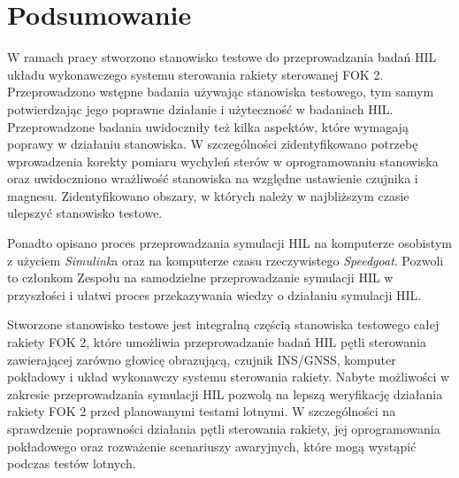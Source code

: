 \section{Podsumowanie}
\label{sec:podsumowanie}
W ramach pracy stworzono stanowisko testowe do przeprowadzania badań HIL układu wykonawczego systemu sterowania rakiety sterowanej FOK 2.
Przeprowadzono wstępne badania używając stanowiska testowego, tym samym potwierdzając jego poprawne działanie
i użyteczność w badaniach HIL. Przeprowadzone badania uwidoczniły też kilka aspektów, które wymagają poprawy w działaniu stanowiska.
W szczególności zidentyfikowano potrzebę wprowadzenia korekty pomiaru wychyleń sterów w oprogramowaniu stanowiska oraz
uwidoczniono wrażliwość stanowiska na względne ustawienie czujnika i magnesu. 
Zidentyfikowano obszary, w których należy w najbliższym czasie ulepszyć stanowisko testowe.

Ponadto opisano proces przeprowadzania symulacji HIL na komputerze osobistym z użyciem \textit{Simulink}a
oraz na komputerze czasu rzeczywistego \textit{Speedgoat}. Pozwoli to członkom
Zespołu na samodzielne przeprowadzanie symulacji HIL w przyszłości i ułatwi proces przekazywania wiedzy o działaniu 
symulacji HIL.

Stworzone stanowisko testowe jest integralną częścią stanowiska 
testowego całej rakiety FOK 2, które umożliwia przeprowadzanie badań HIL pętli sterowania zawierającej
zarówno głowicę obrazującą, czujnik INS/GNSS, komputer pokładowy i układ wykonawczy systemu sterowania rakiety.
Nabyte możliwości w zakresie przeprowadzania symulacji HIL pozwolą na lepszą weryfikację
działania rakiety FOK 2 przed planowanymi testami lotnymi. W szczególności 
na sprawdzenie poprawności działania pętli sterowania rakiety, jej oprogramowania pokładowego oraz rozważenie scenariuszy awaryjnych, które mogą wystąpić podczas testów lotnych. 